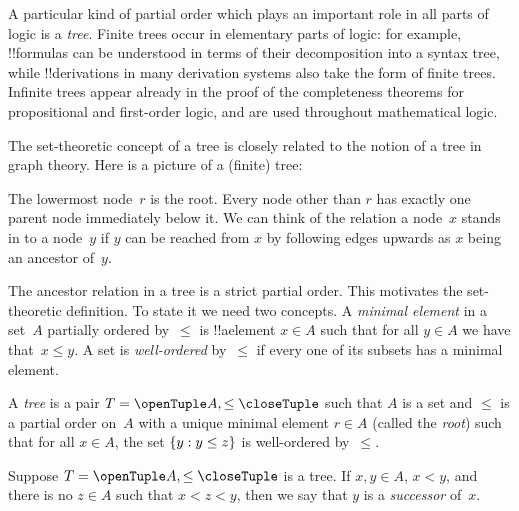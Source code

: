 \documentclass[../../../include/open-logic-section]{subfiles}
\begin{document}

A particular kind of partial order which plays an important role in
all parts of logic is a \emph{tree}. Finite trees occur in elementary
parts of logic: for example, !!{formula}s can be understood in terms
of their decomposition into a syntax tree, while !!{derivation}s in
many derivation systems also take the form of finite trees.
%
Infinite trees appear already in the proof of the completeness
theorems for propositional and first-order logic, and are used
throughout mathematical logic.

The set-theoretic concept of a tree is closely related to the notion
of a tree in graph theory. Here is a picture of a (finite) tree:

\begin{center}
\end{center}

The lowermost node~$r$ is the root. Every node other than $r$ has
exactly one parent node immediately below it. We can think of the relation
a node~$x$ stands in to a node~$y$ if $y$ can be reached from $x$ by
following edges upwards as $x$ being an ancestor of~$y$. 

The ancestor relation in a tree is a strict partial order. This
motivates the set-theoretic definition. To state it we need two
concepts. A \emph{minimal element} in a set~$A$ partially ordered
by~$\le$ is !!a{element} $x \in A$ such that for all $y \in A$ we have
that~$x \le y$. A set is \emph{well-ordered} by~$\le$ if every one of
its subsets has a minimal element.

\begin{defn}[Tree]
A \emph{tree} is a pair $T = \tuple{A, \le}$ such that $A$ is a set
and $\le$ is a partial order on~$A$ with a unique minimal element
$r \in A$ (called the \emph{root}) such that for all $x \in A$,
the set $\{ y : y \le z \}$ is well-ordered by~$\le$.
\end{defn}

\begin{defn}[Successors]
Suppose $T = \tuple{A, \le}$ is a tree.
If $x,y \in A$, $x < y$, and there is no $z \in A$ such that
$x < z < y$, then we say that $y$ is a \emph{successor} of~$x$.
\end{defn}
\end{document}

